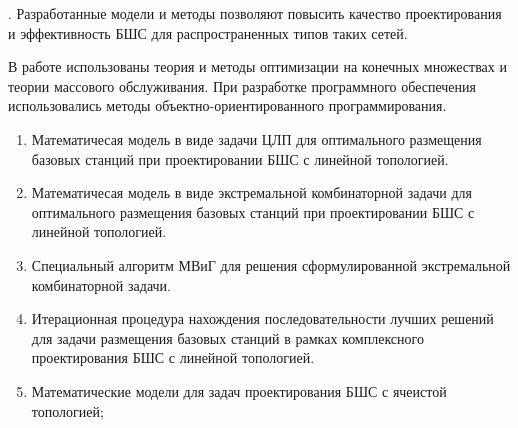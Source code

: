 {\influence}. Разработанные модели и методы позволяют повысить качество проектирования и эффективность БШС для распространенных типов таких сетей.


{\methods} В работе использованы теория и методы оптимизации на конечных множествах и теории массового обслуживания. При разработке программного обеспечения использовались методы объектно-ориентированного программирования.

{}

\begin{enumerate}[beginpenalty=10000] %
    \item Математичесая модель в виде задачи ЦЛП для оптимального размещения базовых станций при проектировании БШС с линейной топологией.
    \item Математичесая модель в виде экстремальной комбинаторной задачи для оптимального размещения базовых станций при проектировании БШС с линейной топологией.
    \item Специальный алгоритм МВиГ для решения сформулированной
    экстремальной комбинаторной задачи.
    \item Итерационная процедура нахождения последовательности лучших
    решений для задачи размещения базовых станций в рамках комплексного
    проектирования БШС с линейной топологией.
    \item Математические модели для задач проектирования БШС с ячеистой
    топологией;
  \end{enumerate}


